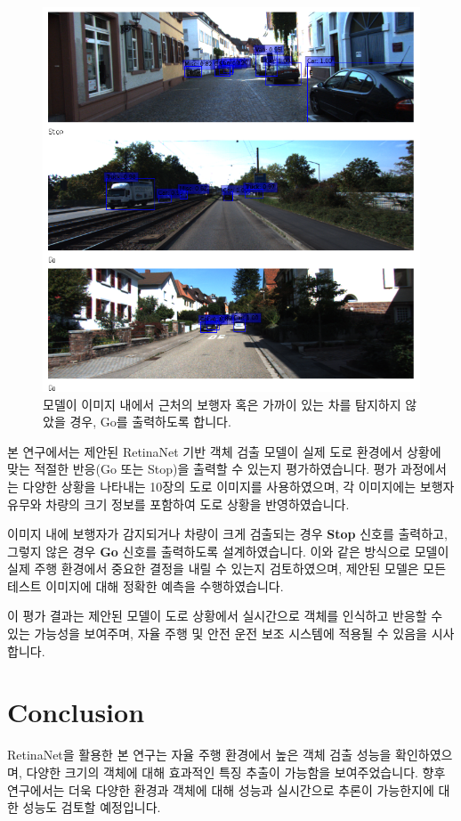 \documentclass[12pt]{article}
\begin{document}
\begin{figure}[h!]
\begin{minipage}{0.45\linewidth}
        \includegraphics[width=\linewidth]{result2.png}
        \caption{모델이 이미지 내에서 근처의 보행자 혹은 가까이 있는 차를 탐지하지 않았을 경우, Go를 출력하도록 합니다.}
        \label{fig:result2}
    \end{minipage}
\end{figure}
본 연구에서는 제안된 RetinaNet 기반 객체 검출 모델이 실제 도로 환경에서 상황에 맞는 적절한 반응(Go 또는 Stop)을 출력할 수 있는지 평가하였습니다. 평가 과정에서는 다양한 상황을 나타내는 10장의 도로 이미지를 사용하였으며, 각 이미지에는 보행자 유무와 차량의 크기 정보를 포함하여 도로 상황을 반영하였습니다.

이미지 내에 보행자가 감지되거나 차량이 크게 검출되는 경우 \textbf{Stop} 신호를 출력하고, 그렇지 않은 경우 \textbf{Go} 신호를 출력하도록 설계하였습니다. 이와 같은 방식으로 모델이 실제 주행 환경에서 중요한 결정을 내릴 수 있는지 검토하였으며, 제안된 모델은 모든 테스트 이미지에 대해 정확한 예측을 수행하였습니다.

이 평가 결과는 제안된 모델이 도로 상황에서 실시간으로 객체를 인식하고 반응할 수 있는 가능성을 보여주며, 자율 주행 및 안전 운전 보조 시스템에 적용될 수 있음을 시사합니다.

\section{Conclusion}
RetinaNet을 활용한 본 연구는 자율 주행 환경에서 높은 객체 검출 성능을 확인하였으며, 다양한 크기의 객체에 대해 효과적인 특징 추출이 가능함을 보여주었습니다. 향후 연구에서는 더욱 다양한 환경과 객체에 대해 성능과 실시간으로 추론이 가능한지에 대한 성능도 검토할 예정입니다. 



\end{document}

